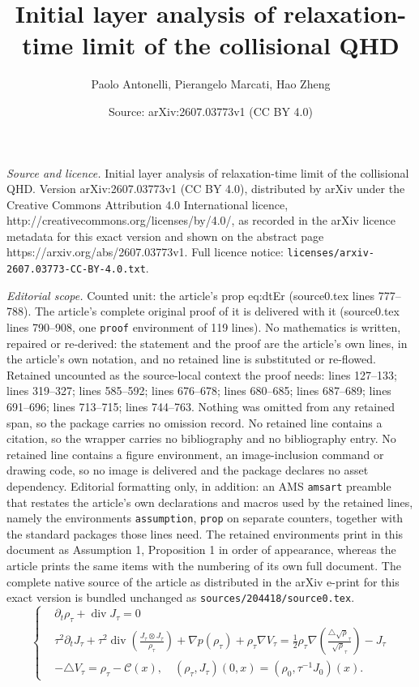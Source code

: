 \documentclass[10pt,a4paper]{amsart}
\title{Initial layer analysis of relaxation-time limit of the collisional QHD}
\author{Paolo Antonelli, Pierangelo Marcati, Hao Zheng}
\date{Source: arXiv:2607.03773v1 (CC BY 4.0)}
\def\d{{\partial}}
\DeclareMathOperator{\diver}{div}
\begin{document}
\maketitle

\noindent\emph{Source and licence.} Initial layer analysis of relaxation-time limit of the collisional QHD. Version arXiv:2607.03773v1 (CC BY 4.0), distributed by arXiv under the Creative Commons Attribution 4.0 International licence, http://creativecommons.org/licenses/by/4.0/, as recorded in the arXiv licence metadata for this exact version and shown on the abstract page https://arxiv.org/abs/2607.03773v1. Full licence notice: \texttt{licenses/arxiv-2607.03773-CC-BY-4.0.txt}.\par\smallskip

\noindent\textit{Editorial scope.} Counted unit: the article's prop eq:dtEr (source0.tex lines 777--788). The article's complete original proof of it is delivered with it (source0.tex lines 790--908, one \texttt{proof} environment of 119 lines). No mathematics is written, repaired or re-derived: the statement and the proof are the article's own lines, in the article's own notation, and no retained line is substituted or re-flowed.  Retained uncounted as the source-local context the proof needs: lines 127--133; lines 319--327; lines 585--592; lines 676--678; lines 680--685; lines 687--689; lines 691--696; lines 713--715; lines 744--763.  Nothing was omitted from any retained span, so the package carries no omission record.  No retained line contains a citation, so the wrapper carries no bibliography and no bibliography entry.  No retained line contains a figure environment, an image-inclusion command or drawing code, so no image is delivered and the package declares no asset dependency.  Editorial formatting only, in addition: an AMS \texttt{amsart} preamble that restates the article's own declarations and macros used by the retained lines, namely the environments \texttt{assumption}, \texttt{prop} on separate counters, together with the standard packages those lines need.  The retained environments print in this document as Assumption 1, Proposition 1 in order of appearance, whereas the article prints the same items with the numbering of its own full document.  The complete native source of the article as distributed in the arXiv e-print for this exact version is bundled unchanged as \texttt{sources/204418/source0.tex}.
\begin{equation}\label{eq:QHD_rs_intro}
\left\{\begin{aligned}
&\d_{t}\rho_\tau+\diver J_\tau=0\\
&\tau^2\d_{t} J_\tau+\tau^2\diver\left(\frac{J_\tau\otimes J_\tau}{\rho_\tau}\right)+\nabla p(\rho_\tau)+\rho_\tau\nabla V_\tau=\frac{1}{2}\rho_\tau\nabla\left(\frac{\triangle\sqrt\rho_\tau}{\sqrt\rho_\tau}\right)-J_\tau\\
&-\triangle V_\tau=\rho_\tau-\mathcal{C}(x),\quad (\rho_\tau,J_\tau)(0,x)=(\rho_0,\tau^{-1}J_0)(x).
\end{aligned}\right.
\end{equation}
\end{document}
